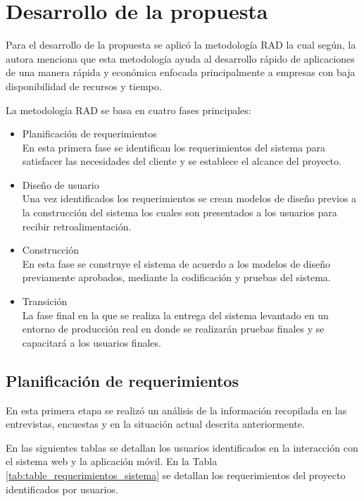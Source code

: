 \section{Desarrollo de la propuesta}\label{sec:desarrollo-propuesta}

Para el desarrollo de la propuesta se aplicó la metodología RAD la cual según\cite{bonilla_cadena_desarrollo_2022}, la autora menciona que esta metodología ayuda al desarrollo rápido de aplicaciones de una manera rápida y económica enfocada principalmente a empresas con baja disponibilidad de recursos y tiempo.

La metodología RAD se basa en cuatro fases principales:

\begin{itemize}
    \item Planificación de requerimientos \\
    En esta primera fase se identifican los requerimientos del sistema para satisfacer las necesidades del cliente y se establece el alcance del proyecto.
    \item Diseño de usuario\\
    Una vez identificados los requerimientos se crean modelos de diseño previos a la construcción del sistema los cuales son presentados a los usuarios para recibir retroalimentación.
    \item Construcción\\
    En esta fase se construye el sistema de acuerdo a los modelos de diseño previamente aprobados, mediante la codificación y pruebas del sistema.
    \item Transición \\
    La fase final en la que se realiza la entrega del sistema levantado en un entorno de producción real en donde se realizarán pruebas finales y se capacitará a los usuarios finales.
\end{itemize}

\subsection{Planificación de requerimientos} \label{subsec:planificacion-requerimientos}

En esta primera etapa se realizó un análisis de la información recopilada en las entrevistas, encuestas y en la situación actual descrita anteriormente.

En las siguientes tablas se detallan los usuarios identificados en la interacción con el sistema web y la aplicación móvil.
En la Tabla \ref{tab:table_requerimientos_sistema} se detallan los requerimientos del proyecto identificados por usuarios.

